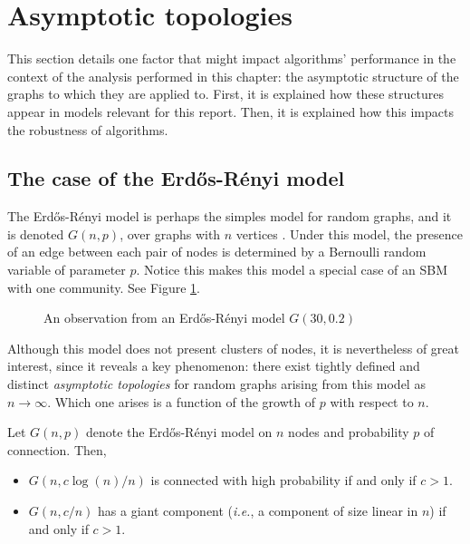 \documentclass[../../main.tex]{subfiles} %
\begin{document}
\section{Asymptotic topologies}  %
\label{sec:asymptotic-topologies}

This section details one factor that might impact algorithms' performance in the 
context of the analysis performed in this chapter: the asymptotic structure of 
the graphs to which they are applied to. First, it is explained how these 
structures appear in models relevant for this report. Then, it is explained how 
this impacts the robustness of algorithms.

\subsection{The case of the Erd\H{o}s-Rényi model}
The Erd\H{o}s-Rényi model is perhaps the simples model for random graphs, 
and it is denoted \(G(n, p)\), over graphs with \(n\) vertices \cite{erdos59a}. 
Under this model, the 
presence of an edge between each pair of nodes is determined by a Bernoulli 
random variable of parameter \(p\). Notice this makes this model a special case 
of an SBM with one community. See Figure \ref{fig:obs-erdos-renyi}. 
\begin{figure}[h]
	\centering
	\caption{An observation from an Erd\H{o}s-Rényi model \(G(30, 0.2)\)}
	\label{fig:obs-erdos-renyi}
\end{figure}

Although this model does not present clusters of nodes, it is nevertheless of 
great interest, since it reveals a key phenomenon: there exist tightly defined 
and distinct \textit{asymptotic topologies} for random graphs arising from this 
model as \(n \to \infty\). Which one arises is a function of the growth of 
\(p\) with respect to \(n\).

\begin{theorem}
	Let \(G(n, p)\) denote the Erd\H{o}s-Rényi model on \(n\) nodes and probability 
	\(p\) of connection. Then,
	\begin{itemize}
		\item \(G(n, c \log(n)/n)\) is connected with high probability if and only if \(c 
		> 1\).
		\item \(G(n, c/n)\) has a giant component (\textit{i.e.}, a component of size 
		linear in \(n\)) if and only if \(c > 1\).
	\end{itemize}
\end{theorem}
\end{document}
